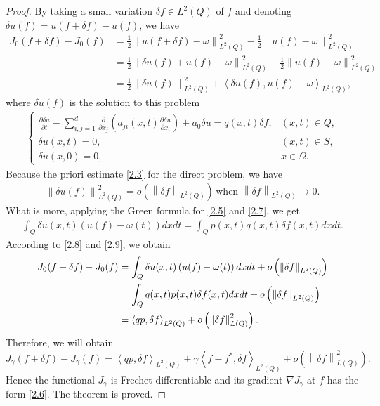 \documentclass[]{article}
\begin{document}
\begin{proof}
	By taking a small variation $\delta f \in L^2(Q)$ of $f$ and denoting $\delta u(f)=u(f+\delta f)-u(f)$, we have
	\begin{align*}
		J_0(f+\delta f)-J_0(f)&=\frac{1}{2}\left\| u(f+\delta f)-\omega\right\|^2_{L^2(Q)}-\frac{1}{2}\left\| u(f)-\omega\right\|^2_{L^2(Q)}\\
		&=\frac{1}{2}\left\| \delta u(f) + u(f)-\omega\right\|^2_{L^2(Q)}-\frac{1}{2}\left\| u(f)-\omega\right\|^2_{L^2(Q)}\\
		&=\frac{1}{2}\left\| \delta u(f)\right\|^2_{L^2(Q)}+\left\langle  \delta u(f),  u(f)-\omega\right\rangle_{L^2(Q)},
	\end{align*}
	where $\delta u(f)$ is the solution to this problem
	\begin{align}\label{2.7}
		\begin{cases}
			\frac{\partial \delta u}{\partial t}-\sum\limits_{i, j=1}^{d}\frac{\partial}{\partial x_j}\left(a_{ji}(x, t)\frac{\partial \delta u}{\partial x_i}\right)+a_0\delta u=q(x, t)\delta f,&(x, t)\in Q,\\
			\delta u(x, t)=0, & (x, t)\in S,\\
			\delta u(x, 0)=0, &x\in \Omega.
		\end{cases}
	\end{align}
	Because the priori estimate \eqref{2.3} for the direct problem, we have
	\begin{align}\label{2.8}
		\left\|\delta u(f)\right\|_{L^2(Q)}^2=o\left(\left\|\delta f\right\|_{L^2(Q)}\right)\, \text{when } \left\|\delta f\right\|_{L^2(Q)}\to 0.
	\end{align}
	What is more, applying the Green formula for \eqref{2.5} and \eqref{2.7}, we get
	\begin{align}\label{2.9}
		\int_{Q} \delta u(x, t) \left( u(f)-\omega(t)\right)dxdt=\int_{Q} p(x, t)q(x, t)\delta f(x, t)dxdt.
	\end{align}
	According to \eqref{2.8} and \eqref{2.9}, we obtain
	\begin{align*}
		J_0(f+\delta f)-J_0(f)&=\int_{Q}\delta u(x, t)\left( u(f)-\omega(t)\right)dxdt+o\left(\left\|\delta f\right\|_{L^2(Q)}\right)\notag\\
		&=\int_Q q(x, t)p(x, t)\delta f(x, t)dxdt+o\left(\left\|\delta f\right\|_{L^2(Q)}\right)\notag\\
		&=\left\langle qp,\delta f \right\rangle_{L^2(Q)}+o\left(\left\|\delta f\right\|^2_{L(Q)}\right).
	\end{align*}
	Therefore, we will obtain
	$$J_\gamma(f+\delta f)-J_\gamma(f)=\left\langle qp,\delta f \right\rangle_{L^2(Q)}+\gamma\left\langle f-f^*,\delta f \right\rangle_{L^2(Q)}+o\left(\left\|\delta f\right\|^2_{L(Q)}\right).$$
	Hence the functional $J_\gamma$ is Frechet differentiable and its gradient $\nabla J_\gamma$ at $f$ has the form \eqref{2.6}. The theorem is proved.
\end{proof}
\end{document}
